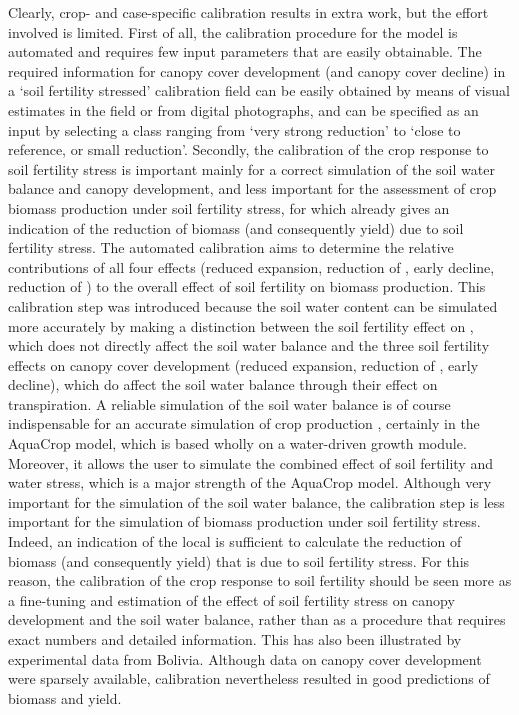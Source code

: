Clearly, crop- and case-specific calibration results in extra work, but the effort involved is limited. First of all, the calibration procedure for the model is automated and requires few input parameters that are easily obtainable. The required information for canopy cover development (\CCx and canopy cover decline) in a `soil fertility stressed' calibration field can be easily obtained by means of visual estimates in the field or from digital photographs, and can be specified as an input by selecting a class ranging from `very strong reduction' to `close to reference, or small reduction'. Secondly, the calibration of the crop response to soil fertility stress is important mainly for a correct simulation of the soil water balance and canopy development, and less important for the assessment of crop biomass production under soil fertility stress, for which \Brel already gives an indication of the reduction of biomass (and consequently yield) due to soil fertility stress. The automated calibration aims to determine the relative contributions of all four effects (reduced \CC expansion, reduction of \CCx, early \CC decline, reduction of \WPster) to the overall effect of soil fertility on biomass production. This calibration step was introduced because the soil water content can be simulated more accurately by making a distinction between the soil fertility effect on \WPster, which does not directly affect the soil water balance and the three soil fertility effects on canopy cover development (reduced \CC expansion, reduction of \CCx, early \CC decline), which do affect the soil water balance through their effect on transpiration. A reliable simulation of the soil water balance is of course indispensable for an accurate simulation of crop production \parencite{aggarwal1995, eitzinger2004}, certainly in the AquaCrop model, which is based wholly on a water-driven growth module. Moreover, it allows the user to simulate the combined effect of soil fertility and water stress, which is a major strength of the AquaCrop model. Although very important for the simulation of the soil water balance, the calibration step is less important for the simulation of biomass production under soil fertility stress. Indeed, an indication of the local \Brel is sufficient to calculate the reduction of biomass (and consequently yield) that is due to soil fertility stress. For this reason, the calibration of the crop response to soil fertility should be seen more as a fine-tuning and estimation of the effect of soil fertility stress on canopy development and the soil water balance, rather than as a procedure that requires exact numbers and detailed information. This has also been illustrated by experimental data from Bolivia. Although data on canopy cover development were sparsely available, calibration nevertheless resulted in good predictions of biomass and yield. 

